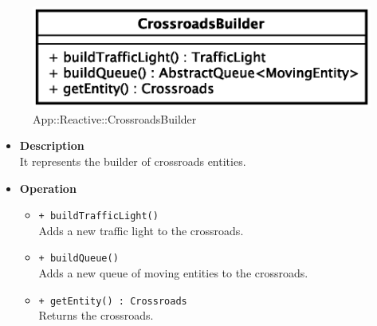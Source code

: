 \begin{figure}[h]
\centering
\includegraphics[scale=0.6,keepaspectratio]{images/solution/crossroads_builder.eps}
\caption{App::Reactive::CrossroadsBuilder}
\label{fig:sd-app-crossroads_builder}
\end{figure}
\FloatBarrier
\begin{itemize}
  \item \textbf{Description} \\
    It represents the builder of crossroads entities. 
  \item \textbf{Operation}
  \begin{itemize} 
    \item \texttt{+ buildTrafficLight()} \\
Adds a new traffic light to the crossroads.
    \item \texttt{+ buildQueue()} \\
Adds a new queue of moving entities to the crossroads.
    \item \texttt{+ getEntity() : Crossroads} \\
Returns the crossroads.
  \end{itemize}
\end{itemize}
